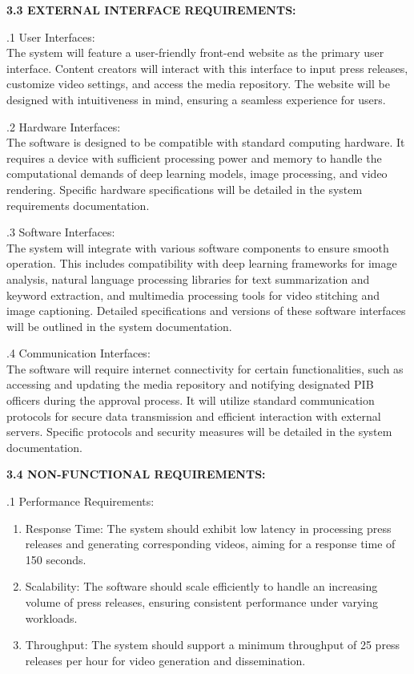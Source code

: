 \documentclass[12pt]{article}
\begin{document}
\bigskip
\justify\fontsize{12}{12}\textbf{3.3 EXTERNAL INTERFACE REQUIREMENTS:}

.1 User Interfaces:\\
\smallskip
\hspace{5mm}The system will feature a user-friendly front-end website as the primary user 
interface. Content creators will interact with this interface to input press releases,
customize video settings, and access the media repository. The website will be 
designed with intuitiveness in mind, ensuring a seamless experience for users.

.2 Hardware Interfaces:\\
\smallskip
\hspace{5mm}
The software is designed to be compatible with standard computing hardware. It 
requires a device with sufficient processing power and memory to handle the 
computational demands of deep learning models, image processing, and video rendering. 
Specific hardware specifications will be detailed in the system requirements 
 documentation.

.3 Software Interfaces:\\
\smallskip
\hspace{5mm}
The system will integrate with various software components to ensure smooth operation.
This includes compatibility with deep learning frameworks for image analysis, natural 
language processing libraries for text summarization and keyword extraction, and 
multimedia processing tools for video stitching and image captioning. Detailed 
specifications and versions of these software interfaces will be outlined in the 
system documentation.

.4 Communication Interfaces:\\
\smallskip
\hspace{5mm}
The software will require internet connectivity for certain functionalities, such as 
accessing and updating the media repository and notifying designated PIB officers 
during the approval process. It will utilize standard communication protocols for 
secure data transmission and efficient interaction with external servers. Specific 
protocols and security measures will be detailed in the system documentation.
\bigskip

\justify \fontsize{12}{12}\textbf{3.4 NON-FUNCTIONAL REQUIREMENTS:}

.1 Performance Requirements:

\begin{enumerate}
\def\labelenumi{\arabic{enumi}.}
\item 
    Response Time: The system should exhibit low latency in processing press releases and generating corresponding videos, aiming for a response time of 150 seconds.
\item 
    Scalability: The software should scale efficiently to handle an increasing volume of press releases, ensuring consistent performance under varying workloads.
\item 
    Throughput: The system should support a minimum throughput of 25 press releases per hour for video generation and dissemination.
\end{enumerate}
\end{document}
